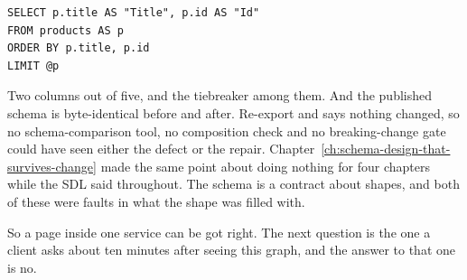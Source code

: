 \begin{verbatim}
SELECT p.title AS "Title", p.id AS "Id"
FROM products AS p
ORDER BY p.title, p.id
LIMIT @p
\end{verbatim}

Two columns out of five, and the tiebreaker among them. And the published schema
is byte-identical before and after. Re-export  and
 says nothing changed, so no schema-comparison tool, no
composition check and no breaking-change gate could have seen either the defect
or the repair. Chapter~\ref{ch:schema-design-that-survives-change} made the same
point about \code{[ID]} doing nothing for four chapters while the SDL said
 throughout. The schema is a contract about shapes, and both of
these were faults in what the shape was filled with.

\medskip
So a page inside one service can be got right. The next question is the one a
client asks about ten minutes after seeing this graph, and the answer to that one
is no.

%
%
